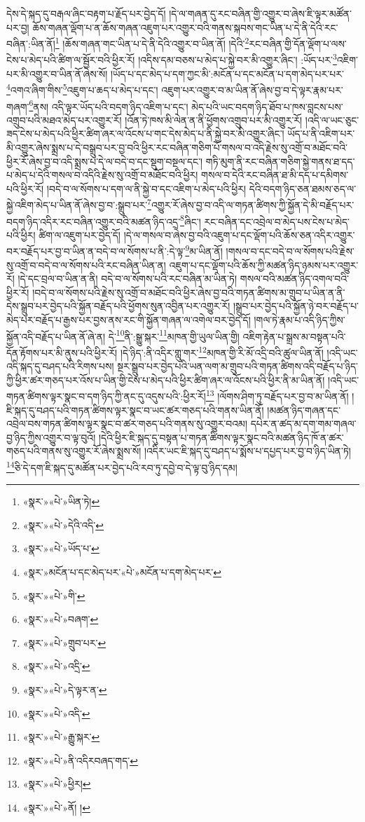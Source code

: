 དེས་དེ་སྐད་དུ་བརྒལ་ཞིང་བརྟག་པ་རྗོད་པར་བྱེད་དོ། །དེ་ལ་གཞན་དུ་རང་བཞིན་གྱི་འགྱུར་བ་ཞེས་ཇི་ལྟར་མཚོན་པར་བྱ། ཆོས་གཞན་ལྡོག་པ་ན་ཆོས་གཞན་འཇུག་པར་འགྱུར་བའི་གནས་སྐབས་གང་ཡིན་པ་དེ་ནི་དེའི་རང་བཞིན་:ཡིན་ནོ།\footnote{«སྣར་»«པེ་»ཡིན་ཏེ།} །ཆོས་གཞན་གང་ཡིན་པ་དེ་ནི་དེའི་འགྱུར་བ་ཡིན་ནོ། །དེའི་\footnote{«སྣར་»«པེ་»དེའི་འདི་}རང་བཞིན་གྱི་དོན་ལྡོག་པ་ལས་ངེས་པ་མེད་པའི་ཚིག་ལ་སྦྱོར་བའི་ཕྱིར་རོ། །འདིས་དམ་བཅས་པ་མེད་པ་སྐྱེ་བར་མི་འགྱུར་ཞིང་། :ཡོད་པར་\footnote{«སྣར་»«པེ་»ཡོད་པ་}འཇིག་པར་མི་འགྱུར་བ་ཡིན་ནོ་ཞེས་སོ། །ཡོད་པ་དང་མེད་པ་དག་ཀྱང་མི་:མངོན་པ་དང་མངོན་པ་དག་མེད་པར་པར་\footnote{«སྣར་»མངོན་པ་དང་མེད་པར་«པེ་»མངོན་པ་དག་མེད་པར་}འགའ་ཞིག་གིས་\footnote{«སྣར་»«པེ་»གི་}འཇུག་པ་ཆད་པ་མེད་པ་དང་། འཇུག་པར་འགྱུར་བ་མ་ཡིན་ནོ་ཞེས་བྱ་བ་དེ་ལྟར་རྣམ་པར་གཞག་\footnote{«སྣར་»«པེ་»བཞག་}ནས། འདི་ལྟར་ཡོད་པའི་བདག་ཉིད་འཇིག་པ་དང་། མེད་པའི་ཡང་བདག་ཉིད་ཐོབ་པ་ཁས་བླངས་པས་འགྲུབ་པའི་མཐའ་མེད་པར་འགྱུར་རོ། །འོན་ཏེ་ཁས་མི་ལེན་ན་ནི་ཕྱོགས་འགྲུབ་པར་མི་འགྱུར་རོ། །འདི་ལ་ཡང་ཅུང་ཟད་ངེས་པ་མེད་པའི་ཕྱིར་ཚིག་ཞར་ལ་འོངས་པ་གང་དེས་མེད་པ་ནི་སྐྱེ་བར་མི་འགྱུར་ཞིང་། ཡོད་པ་ནི་འཇིག་པར་མི་འགྱུར་ཞེས་སྨྲས་པ་དེ་བསྒྲུབ་པར་བྱ་བའི་ཕྱིར་རང་བཞིན་གཅིག་པོ་གསལ་བ་འདི་རྗེས་སུ་འགྲོ་བ་མཐོང་བའི་ཕྱིར་རོ་ཞེས་བྱ་བ་འདི་སྨྲས་པ་དེ་ལ་བདེ་བ་དང་སྡུག་བསྔལ་དང་། གཏི་མུག་ནི་རང་བཞིན་གཅིག་སྐྱེ་གནས་ཐ་དད་པ་མེད་པ་དེའི་གསལ་བ་འདིའི་རྗེས་སུ་འགྲོ་བ་མཐོང་བའི་ཕྱིར། གསལ་བ་དེའི་རང་བཞིན་ཐ་མི་དད་པ་དམིགས་པའི་ཕྱིར་རོ། །བདེ་བ་ལ་སོགས་པ་དག་ལ་ནི་སྐྱེ་བ་དང་འཇིག་པ་མེད་པའི་ཕྱིར། དེའི་བདག་ཉིད་ཅན་ཐམས་ཅད་ལ་སྐྱེ་འཇིག་མེད་པ་ཡིན་ནོ་ཞེས་བྱ་བ་:སྒྲུབ་པར་\footnote{«སྣར་»«པེ་»གྲུབ་པར་}འགྱུར་རོ་ཞེས་བྱ་བ་འདི་ལ་གཏན་ཚིགས་ཀྱི་སྐྱོན་དེ་མི་བརྗོད་པར་བདག་ཉིད་འདིར་རང་བཞིན་འགྱུར་བའི་མཚན་ཉིད་འདྲ་\footnote{«སྣར་»«པེ་»འདྲི་}ཞིང་། རང་བཞིན་དང་འབྲེལ་བ་མེད་པས་ངེས་པ་མེད་པའི་ཕྱིར། ཚིག་ལ་འཇུག་པར་བྱེད་དོ། །དེ་ལ་གསལ་བ་ཞེས་བྱ་བའི་འཇུག་པ་དང་ལྡོག་པའི་ཆོས་ཅན་འདིར་འགྱུར་བར་བརྗོད་པར་བྱ་བ་ཡིན་ན་བདེ་བ་ལ་སོགས་པ་ནི་:དེ་ལྟ་\footnote{«སྣར་»«པེ་»དེ་ལྟར་ན་}མ་ཡིན་ནོ། །གསལ་བ་དང་བདེ་བ་ལ་སོགས་པའི་རྗེས་སུ་འགྲོ་བ་བདེ་བ་ལ་སོགས་པའི་རང་བཞིན་ཡིན་ན། འཇུག་པ་དང་ལྡོག་པའི་ཆོས་ཀྱི་མཚན་ཉིད་ཉམས་པར་འགྱུར་རོ། །དེ་དང་བྲལ་བ་ཡིན་ན་ནི། བདེ་བ་ལ་སོགས་པའི་རང་བཞིན་མ་ཡིན་ཏེ། གསལ་བའི་མཚན་ཉིད་འགལ་བའི་ཕྱིར་རོ། །བདེ་བ་ལ་སོགས་པའི་རྗེས་སུ་འགྲོ་བ་མཐོང་བའི་ཕྱིར་ཞེས་བྱ་བའི་གཏན་ཚིགས་མ་གྲུབ་པ་ཡིན་ན་ནི་དེས་སྒྲུབ་པར་བྱེད་པའི་སྐྱོན་བརྗོད་པའི་ཕྱོགས་སུན་འབྱིན་པར་འགྱུར་རོ། །སྒྲུབ་པར་བྱེད་པའི་སྐྱོན་ཉེ་བར་བརྗོད་པ་མེད་པར་བརྗོད་པ་རྒྱས་པར་བྱས་ནས་རང་གི་སྐྱོན་གཞན་ལ་འགེལ་བར་བྱེད་དོ། །གལ་ཏེ་རྣམ་པ་འདི་ཉིད་ཀྱིས་སྐྱོན་འདི་བརྗོད་པ་ཡིན་ནོ་ཞེ་ན། དེ་\footnote{«སྣར་»«པེ་»འདི་}ནི་:སྒྱུ་སྐར་\footnote{«སྣར་»«པེ་»རྒྱུ་སྐར་}མཁན་གྱི་ཡུལ་ཡིན་གྱི། འཇིག་རྟེན་པ་སྒྲས་མ་བསྟན་པའི་དོན་རྟོགས་པར་མི་ནུས་པའི་ཕྱིར་རོ། །དེ་ཉིད་:ནི་འདིར་གླུ་གར་\footnote{«སྣར་»«པེ་»ནི་འདིརབཞད་གད་}མཁན་གྱི་རི་མོ་འདྲི་བའི་ཚུལ་ཡིན་ནོ། །འདི་ཡང་འདི་སྐད་དུ་བཤད་པའི་རིགས་པས། སྔར་སྒྲུབ་པར་བྱེད་པའི་ཡན་ལག་མ་གྲུབ་པའི་གཏན་ཚིགས་འདི་བརྗོད་པ་ཉིད་ཀྱི་ཕྱིར་ཚར་གཅད་པར་འོས་པ་ཡིན་གྱི་ངེས་པ་མེད་པའི་ཕྱིར་ཚིག་ཞར་ལ་འོངས་པའི་ཕྱིར་ནི་མ་ཡིན་ནོ། །འདི་ཡང་གཏན་ཚིགས་ལྟར་སྣང་བ་དག་ཉིད་ཀྱི་ནང་དུ་འདུས་པའི་:ཕྱིར་རོ།\footnote{«སྣར་»«པེ་»ཕྱིར།} །ལོགས་ཤིག་ཏུ་བརྗོད་པར་བྱ་བ་མ་ཡིན་ནོ། །ཇི་སྐད་དུ་བཤད་པའི་གཏན་ཚིགས་ལྟར་སྣང་བ་ཡང་ཚར་གཅད་པའི་གནས་ཡིན་ནོ། །མཚན་ཉིད་གཞན་དང་འབྲེལ་བས་གཏན་ཚིགས་ལྟར་སྣང་བ་ཚར་གཅད་པའི་གནས་སུ་འགྱུར་བའམ། དཔེར་ན་ཚད་མ་དག་གམ་གཞལ་བྱ་ཉིད་ཀྱིས་འགྱུར་བ་ལྟ་བུའོ། །དེའི་ཕྱིར་ཇི་སྐད་དུ་བསྟན་པ་གཏན་ཚིགས་ལྟར་སྣང་བའི་མཚན་ཉིད་ཁོ་ན་ཚར་གཅད་པའི་གནས་སུ་འགྱུར་རོ་ཞེས་སྨྲས་སོ། །འདིར་ཡང་ཇི་སྐད་དུ་བཤད་པ་སྨོས་པ་དཔྱད་པར་བྱ་བ་ཉིད་ཡིན་ཏེ། \footnote{«སྣར་»«པེ་»ནོ། ། }ཅི་དེ་དག་ཇི་སྐད་དུ་མཚོན་པར་བྱེད་པའི་རབ་ཏུ་དབྱེ་བ་དེ་ལྟ་བུ་ཉིད་དམ། 